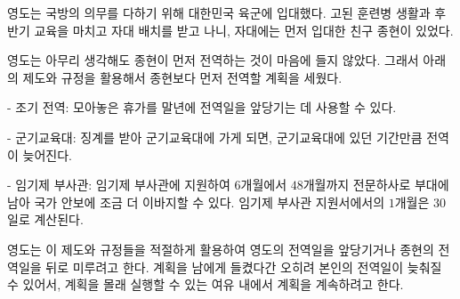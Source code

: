 영도는 국방의 의무를 다하기 위해 대한민국 육군에 입대했다. 고된 훈련병 생활과 후반기 교육을 마치고 자대 배치를 받고 나니, 자대에는 먼저 입대한 친구 종현이 있었다.

영도는 아무리 생각해도 종현이 먼저 전역하는 것이 마음에 들지 않았다. 그래서 아래의 제도와 규정을 활용해서 종현보다 먼저 전역할 계획을 세웠다.

- 조기 전역: 모아놓은 휴가를 말년에 전역일을 앞당기는 데 사용할 수 있다.

- 군기교육대: 징계를 받아 군기교육대에 가게 되면, 군기교육대에 있던 기간만큼 전역이 늦어진다.

- 임기제 부사관: 임기제 부사관에 지원하여 $6$개월에서 $48$개월까지 전문하사로 부대에 남아 국가 안보에 조금 더 이바지할 수 있다. 임기제 부사관 지원서에서의 $1$개월은 $30$일로 계산된다.

영도는 이 제도와 규정들을 적절하게 활용하여 영도의 전역일을 앞당기거나 종현의 전역일을 뒤로 미루려고 한다. 계획을 남에게 들켰다간 오히려 본인의 전역일이 늦춰질 수 있어서, 계획을 몰래 실행할 수 있는 여유 내에서 계획을 계속하려고 한다.

